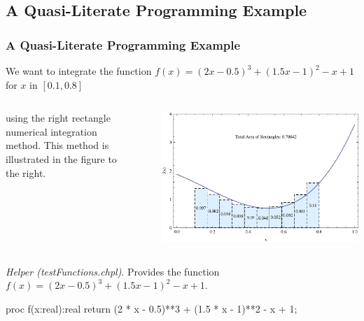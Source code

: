 \documentclass{beamer}
\begin{document}
\subsection{A Quasi-Literate Programming Example}
\begin{frame}[fragile]
  \frametitle{A Quasi-Literate Programming Example}
  We want to integrate the function $f(x) = (2 x-0.5)^3+(1.5 x-1)^2-x+1$ for $x$ in $[0.1,0.8]$
  \begin{columns}[onlytextwidth]
    \begin{column}{0.3\textwidth}
      using the right rectangle numerical integration method. This method is illustrated in 
      the figure to the right.
    \end{column}
    \begin{column}{0.1\textwidth}
    \end{column}
    \begin{column}{0.6\textwidth}
      \includegraphics[scale=.45]{../../fig/rightrectangle-10.eps}
    \end{column}
  \end{columns}
  \textit{Helper (testFunctions.chpl)}. Provides the function $f(x) = (2 x-0.5)^3+(1.5 x-1)^2-x+1$.
  \begin{chapel}
proc f(x:real):real {
  return (2 * x - 0.5)**3 + (1.5 * x - 1)**2 - x + 1;
} 
  \end{chapel}
\end{frame}
\end{document}
